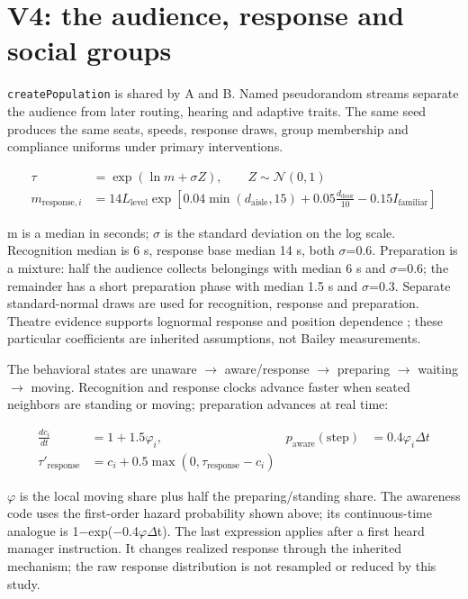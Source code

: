 \documentclass[11pt,a4paper]{article}
\newcommand{\code}[1]{{\small\nolinkurl{#1}}}
\begin{document}
\section{V4: the audience, response and social groups}\label{sec:6}

\code{createPopulation} is shared by A and B. Named pseudorandom streams separate the audience from later routing, hearing and adaptive traits. The same seed produces the same seats, speeds, response draws, group membership and compliance uniforms under primary interventions.


\begin{equation}
\begin{aligned}
\tau&=\exp(\ln m+\sigma Z),\qquad Z\sim\mathcal N(0,1) \\
m_{\mathrm{response},i}&=14L_{\mathrm{level}}\exp\!\left[0.04\min(d_{\mathrm{aisle}},15)+0.05\frac{d_{\mathrm{door}}}{10}-0.15I_{\mathrm{familiar}}\right]
\end{aligned}
\tag{8}\label{eq:8}
\end{equation}

m is a median in seconds; \ensuremath{\sigma} is the standard deviation on the log scale. Recognition median is 6 s, response base median 14 s, both \ensuremath{\sigma}=0.6. Preparation is a mixture: half the audience collects belongings with median 6 s and \ensuremath{\sigma}=0.6; the remainder has a short preparation phase with median 1.5 s and \ensuremath{\sigma}=0.3. Separate standard-normal draws are used for recognition, response and preparation. Theatre evidence supports lognormal response and position dependence \cite{R5}; these particular coefficients are inherited assumptions, not Bailey measurements.


The behavioral states are unaware \ensuremath{\to} aware/response \ensuremath{\to} preparing \ensuremath{\to} waiting \ensuremath{\to} moving. Recognition and response clocks advance faster when seated neighbors are standing or moving; preparation advances at real time:


\begin{equation}
\begin{aligned}
\frac{dc_i}{dt}&=1+1.5\varphi_i, & p_{\mathrm{aware}}(\text{step})&=0.4\varphi_i\Delta t \\
\tau'_{\mathrm{response}}&=c_i+0.5\max(0,\tau_{\mathrm{response}}-c_i)
\end{aligned}
\tag{9}\label{eq:9}
\end{equation}

\ensuremath{\varphi} is the local moving share plus half the preparing/standing share. The awareness code uses the first-order hazard probability shown above; its continuous-time analogue is 1\ensuremath{-}exp(\ensuremath{-}0.4\ensuremath{\varphi}\ensuremath{\Delta}t). The last expression applies after a first heard manager instruction. It changes realized response through the inherited mechanism; the raw response distribution is not resampled or reduced by this study.
\end{document}
